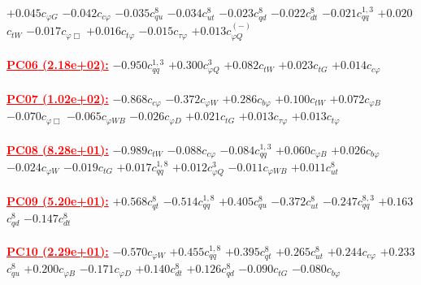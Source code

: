 \documentclass{article}
\begin{document}
{$+0.045$}{\rm $c_{\varphi G}$}
{$-0.042$}{\rm $c_{c \varphi}$}
{$-0.035$}{\rm $c_{qu}^{8}$}
{$-0.034$}{\rm $c_{ut}^{8}$}
{$-0.023$}{\rm $c_{qd}^{8}$}
{$-0.022$}{\rm $c_{dt}^{8}$}
{$-0.021$}{\rm $c_{qq}^{1,3}$}
{$+0.020$}{\rm $c_{tW}$}
{$-0.017$}{\rm $c_{\varphi \Box}$}
{$+0.016$}{\rm $c_{t \varphi}$}
{$-0.015$}{\rm $c_{\tau \varphi}$}
{$+0.013$}{\rm $c_{\varphi Q}^{(-)}$}
 \nonumber \\ \nonumber \\
\noindent \textcolor{red}{\underline{\bf{PC06} (2.18e+02):}}
{$-0.950$}{\rm $c_{qq}^{1,3}$}
{$+0.300$}{\rm $c_{\varphi Q}^{3}$}
{$+0.082$}{\rm $c_{tW}$}
{$+0.023$}{\rm $c_{tG}$}
{$+0.014$}{\rm $c_{c \varphi}$}
 \nonumber \\ \nonumber \\
\noindent \textcolor{red}{\underline{\bf{PC07} (1.02e+02):}}
{$-0.868$}{\rm $c_{c \varphi}$}
{$-0.372$}{\rm $c_{\varphi W}$}
{$+0.286$}{\rm $c_{b \varphi}$}
{$+0.100$}{\rm $c_{tW}$}
{$+0.072$}{\rm $c_{\varphi B}$}
{$-0.070$}{\rm $c_{\varphi \Box}$}
{$-0.065$}{\rm $c_{\varphi WB}$}
{$-0.026$}{\rm $c_{\varphi D}$}
{$+0.021$}{\rm $c_{tG}$}
{$+0.013$}{\rm $c_{\tau \varphi}$}
{$+0.013$}{\rm $c_{t \varphi}$}
 \nonumber \\ \nonumber \\
\noindent \textcolor{red}{\underline{\bf{PC08} (8.28e+01):}}
{$-0.989$}{\rm $c_{tW}$}
{$-0.088$}{\rm $c_{c \varphi}$}
{$-0.084$}{\rm $c_{qq}^{1,3}$}
{$+0.060$}{\rm $c_{\varphi B}$}
{$+0.026$}{\rm $c_{b \varphi}$}
{$-0.024$}{\rm $c_{\varphi W}$}
{$-0.019$}{\rm $c_{tG}$}
{$+0.017$}{\rm $c_{qq}^{1,8}$}
{$+0.012$}{\rm $c_{\varphi Q}^{3}$}
{$-0.011$}{\rm $c_{\varphi WB}$}
{$+0.011$}{\rm $c_{ut}^{8}$}
 \nonumber \\ \nonumber \\
\noindent \textcolor{red}{\underline{\bf{PC09} (5.20e+01):}}
{$+0.568$}{\rm $c_{qt}^{8}$}
{$-0.514$}{\rm $c_{qq}^{1,8}$}
{$+0.405$}{\rm $c_{qu}^{8}$}
{$-0.372$}{\rm $c_{ut}^{8}$}
{$-0.247$}{\rm $c_{qq}^{8,3}$}
{$+0.163$}{\rm $c_{qd}^{8}$}
{$-0.147$}{\rm $c_{dt}^{8}$}
 \nonumber \\ \nonumber \\
\noindent \textcolor{red}{\underline{\bf{PC10} (2.29e+01):}}
{$-0.570$}{\rm $c_{\varphi W}$}
{$+0.455$}{\rm $c_{qq}^{1,8}$}
{$+0.395$}{\rm $c_{qt}^{8}$}
{$+0.265$}{\rm $c_{ut}^{8}$}
{$+0.244$}{\rm $c_{c \varphi}$}
{$+0.233$}{\rm $c_{qu}^{8}$}
{$+0.200$}{\rm $c_{\varphi B}$}
{$-0.171$}{\rm $c_{\varphi D}$}
{$+0.140$}{\rm $c_{dt}^{8}$}
{$+0.126$}{\rm $c_{qd}^{8}$}
{$-0.090$}{\rm $c_{tG}$}
{$-0.080$}{\rm $c_{b \varphi}$}
\end{document}

